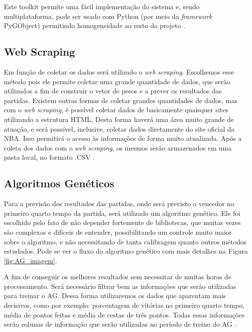 \documentclass[brazilian]{ifsc-tcc}
\begin{document}
Este toolkit permite uma fácil implementação do sistema e, sendo multiplataforma, pode ser usado com Python (por meio da \textit{framework} PyGObject) permitindo homogeneidade ao resto do projeto \cite{GTK}. 

\subsection{Web Scraping}

Em função de coletar os dados será utilizado o \textit{web scraping}. Escolhemos esse método pois ele permite coletar uma grande quantidade de dados, que serão utilizados a fim de construir o vetor de pesos e a prever os resultados das partidas. Existem outras formas de coletar grandes quantidades de dados, mas com o \textit{web scraping}, é possível coletar dados de basicamente quaisquer sites utilizando a estrutura HTML, Desta forma haverá uma área muito grande de atuação, e será possível, inclusive, coletar dados diretamente do site oficial da NBA. Isso permitirá o acesso às informações de forma muito atualizada. Após a coleta dos dados com o \textit{web scraping}, os mesmos serão armazenados em uma pasta local, no formato .CSV  \cite{livro-web-scraping}.

\subsection{Algoritmos Genéticos}

Para a previsão dos resultados das partidas, onde será previsto o vencedor no primeiro quarto tempo da partida, será utilizado um algoritmo genético. 
Ele foi escolhido pelo fato de não depender fortemente de bibliotecas, que muitas vezes são complexas e difíceis de entender, possibilitando um controle muito maior sobre o algoritmo, e não necessitando de tanta calibragem quanto outros métodos estudados. Pode se ver o fluxo do algoritmo genético com mais detalhes na Figura \ref{fig:AG_imagem}.

A fim de conseguir os melhores resultados sem necessitar de muitas horas de processamento. Será necessário filtrar bem as informações que serão utilizadas para treinar o AG. Dessa forma utilizaremos os dados que aparentam mais decisivos, como por exemplo: porcentagem de vitórias no primeiro quarto tempo, média de pontos feitas e média de cestas de três pontos. Todas essas informações serão colunas de informação que serão utilizadas no período de treino do AG \cite{livro-algoritmo-genetico}.
\end{document}
